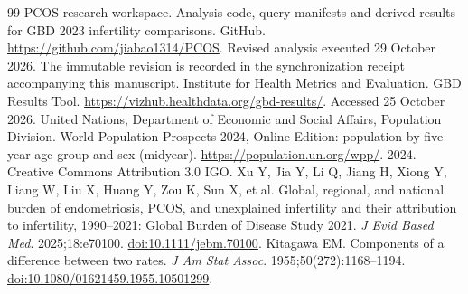 \documentclass[11pt,a4paper]{article}
\begin{document}
{\begin{thebibliography}{99}
 PCOS research workspace. Analysis code, query manifests and derived results for GBD 2023 infertility comparisons. GitHub. \url{https://github.com/jiabao1314/PCOS}. Revised analysis executed 29 October 2026. The immutable revision is recorded in the synchronization receipt accompanying this manuscript.
 Institute for Health Metrics and Evaluation. GBD Results Tool. \url{https://vizhub.healthdata.org/gbd-results/}. Accessed 25 October 2026.
 United Nations, Department of Economic and Social Affairs, Population Division. World Population Prospects 2024, Online Edition: population by five-year age group and sex (midyear). \url{https://population.un.org/wpp/}. 2024. Creative Commons Attribution 3.0 IGO.
Xu Y, Jia Y, Li Q, Jiang H, Xiong Y, Liang W, Liu X, Huang Y, Zou K, Sun X, et al. Global, regional, and national burden of endometriosis, PCOS, and unexplained infertility and their attribution to infertility, 1990--2021: Global Burden of Disease Study 2021. \emph{J Evid Based Med}. 2025;18:e70100. \href{https://doi.org/10.1111/jebm.70100}{doi:10.1111/jebm.70100}.
 Kitagawa EM. Components of a difference between two rates. \emph{J Am Stat Assoc}. 1955;50(272):1168--1194. \href{https://doi.org/10.1080/01621459.1955.10501299}{doi:10.1080/01621459.1955.10501299}.
\end{thebibliography}
}
\clearpage
\end{document}
